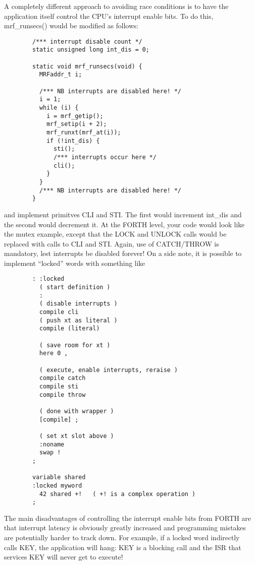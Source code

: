 \documentclass{article}
\begin{document}
A completely different approach to avoiding race conditions is to have
the application itself control the CPU's interrupt enable bits. To do
this, mrf\_runsecs() would be modified as follows:
\begin{verbatim}
        /*** interrupt disable count */
        static unsigned long int_dis = 0;

        static void mrf_runsecs(void) {
          MRFaddr_t i;
        
          /*** NB interrupts are disabled here! */
          i = 1;
          while (i) {
            i = mrf_getip();
            mrf_setip(i + 2);
            mrf_runxt(mrf_at(i));
            if (!int_dis) {
              sti();
              /*** interrupts occur here */
              cli();
            }
          }
          /*** NB interrupts are disabled here! */
        }
\end{verbatim}
and implement primitves CLI and STI. The first would increment int\_dis
and the second would decrement it. At the FORTH level, your code would
look like the mutex example, except that the LOCK and UNLOCK calls would
be replaced with calls to CLI and STI. Again, use of CATCH/THROW is
mandatory, lest interrupts be disabled forever! On a side note, it is
possible to implement ``locked'' words with something like
\begin{verbatim}
        : :locked
          ( start definition )
          :
          ( disable interrupts )
          compile cli
          ( push xt as literal )
          compile (literal)

          ( save room for xt )
          here 0 ,

          ( execute, enable interrupts, reraise )
          compile catch
          compile sti
          compile throw

          ( done with wrapper )
          [compile] ;

          ( set xt slot above )
          :noname
          swap !
        ;

        variable shared
        :locked myword
          42 shared +!   ( +! is a complex operation )
        ;
\end{verbatim}
The main disadvantages of controlling the interrupt enable bits from
FORTH are that interrupt latency is obviously greatly increased and
programming mistakes are potentially harder to track down. For example,
if a locked word indirectly calls KEY, the application will hang: KEY is
a blocking call and the ISR that services KEY will never get to execute!
\end{document}
